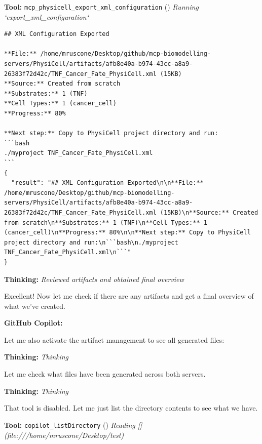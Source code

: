 \documentclass[11pt,a4paper]{article}
\begin{document}
\begin{toolokbox}
\textbf{Tool:} \texttt{mcp\_physicell\_export\_xml\_configuration} (\checkmark)
\textit{Running `export\_xml\_configuration`}
\begin{lstlisting}
## XML Configuration Exported

**File:** /home/mruscone/Desktop/github/mcp-biomodelling-servers/PhysiCell/artifacts/afb8e40a-b974-43cc-a8a9-26383f72d42c/TNF_Cancer_Fate_PhysiCell.xml (15KB)
**Source:** Created from scratch
**Substrates:** 1 (TNF)
**Cell Types:** 1 (cancer_cell)
**Progress:** 80%

**Next step:** Copy to PhysiCell project directory and run:
```bash
./myproject TNF_Cancer_Fate_PhysiCell.xml
```
{
  "result": "## XML Configuration Exported\n\n**File:** /home/mruscone/Desktop/github/mcp-biomodelling-servers/PhysiCell/artifacts/afb8e40a-b974-43cc-a8a9-26383f72d42c/TNF_Cancer_Fate_PhysiCell.xml (15KB)\n**Source:** Created from scratch\n**Substrates:** 1 (TNF)\n**Cell Types:** 1 (cancer_cell)\n**Progress:** 80%\n\n**Next step:** Copy to PhysiCell project directory and run:\n```bash\n./myproject TNF_Cancer_Fate_PhysiCell.xml\n```"
}
\end{lstlisting}
\end{toolokbox}
\begin{thinkbox}
\textbf{Thinking:} \textit{Reviewed artifacts and obtained final overview}

Excellent! Now let me check if there are any artifacts and get a final overview of what we've created.

\end{thinkbox}
\begin{copilotbox}
\textbf{GitHub Copilot:}

Let me also activate the artifact management to see all generated files:

\end{copilotbox}
\begin{thinkbox}
\textbf{Thinking:} \textit{Thinking}

Let me check what files have been generated across both servers.

\end{thinkbox}
\begin{thinkbox}
\textbf{Thinking:} \textit{Thinking}

That tool is disabled. Let me just list the directory contents to see what we have.

\end{thinkbox}
\begin{toolokbox}
\textbf{Tool:} \texttt{copilot\_listDirectory} (\checkmark)
\textit{Reading [](file:///home/mruscone/Desktop/test)}
\end{toolokbox}
\end{document}
